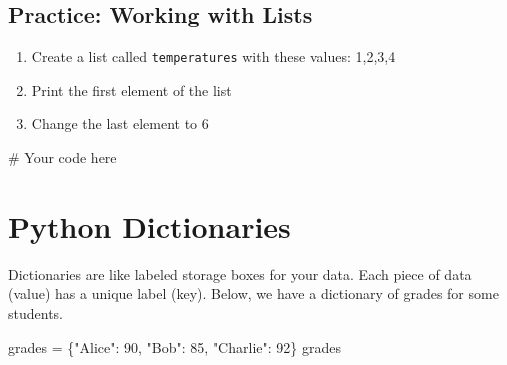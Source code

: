 \documentclass[
  letterpaper,
  DIV=11,
  numbers=noendperiod]{scrreprt}
\newenvironment{Shaded}{\begin{snugshade}}{\end{snugshade}}
\newcommand{\CommentTok}[1]{\textcolor[rgb]{0.37,0.37,0.37}{#1}}
\newcommand{\DecValTok}[1]{\textcolor[rgb]{0.68,0.00,0.00}{#1}}
\newcommand{\NormalTok}[1]{\textcolor[rgb]{0.00,0.23,0.31}{#1}}
\newcommand{\OperatorTok}[1]{\textcolor[rgb]{0.37,0.37,0.37}{#1}}
\newcommand{\StringTok}[1]{\textcolor[rgb]{0.13,0.47,0.30}{#1}}
\providecommand{\tightlist}{%
  \setlength{\itemsep}{0pt}\setlength{\parskip}{0pt}}\usepackage{longtable,booktabs,array}
\begin{document}
\begin{tcolorbox}[enhanced jigsaw, colframe=quarto-callout-tip-color-frame, opacityback=0, titlerule=0mm, bottomrule=.15mm, breakable, leftrule=.75mm, colbacktitle=quarto-callout-tip-color!10!white, title=\textcolor{quarto-callout-tip-color}{\faLightbulb}\hspace{0.5em}{Practice}, rightrule=.15mm, coltitle=black, opacitybacktitle=0.6, colback=white, left=2mm, arc=.35mm, toptitle=1mm, bottomtitle=1mm, toprule=.15mm]

\subsection{Practice: Working with
Lists}\label{practice-working-with-lists}

\begin{enumerate}
\def\labelenumi{\arabic{enumi}.}
\tightlist
\item
  Create a list called \texttt{temperatures} with these values: 1,2,3,4
\item
  Print the first element of the list
\item
  Change the last element to 6
\end{enumerate}

\begin{Shaded}
\begin{Highlighting}[]
\CommentTok{\# Your code here}
\end{Highlighting}
\end{Shaded}

\end{tcolorbox}

\section{Python Dictionaries}\label{python-dictionaries}

Dictionaries are like labeled storage boxes for your data. Each piece of
data (value) has a unique label (key). Below, we have a dictionary of
grades for some students.

\begin{Shaded}
\begin{Highlighting}[]
\NormalTok{grades }\OperatorTok{=}\NormalTok{ \{}\StringTok{"Alice"}\NormalTok{: }\DecValTok{90}\NormalTok{, }\StringTok{"Bob"}\NormalTok{: }\DecValTok{85}\NormalTok{, }\StringTok{"Charlie"}\NormalTok{: }\DecValTok{92}\NormalTok{\}}
\NormalTok{grades}
\end{Highlighting}
\end{Shaded}
\end{document}
